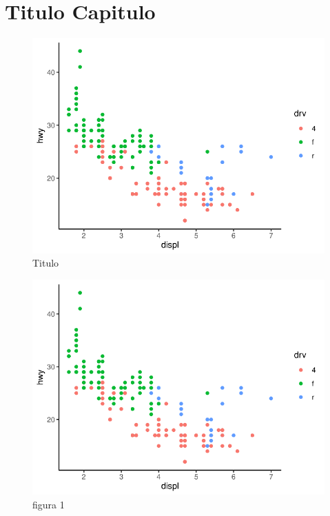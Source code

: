 \chapter{Titulo Capitulo}
\lipsum[1-2]
\begin{figure}
	\caption{Titulo}
	\includegraphics[width=\linewidth]{fig/plot}
\end{figure}
\lipsum[1-5]
\begin{figure}
	\caption{figura 1}
	\includegraphics[width=\linewidth]{fig/plot}
\end{figure}
\lipsum[1-5]
